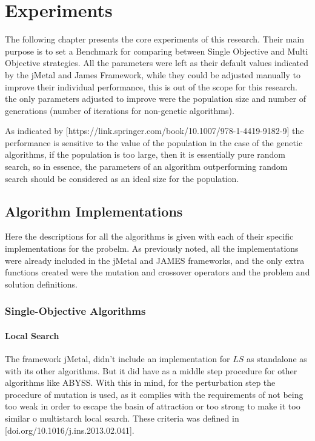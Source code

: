 \chapter{Experiments}
\label{chapter:chapter05}

The following chapter presents the core experiments of this research. Their main purpose is to set a Benchmark for comparing between Single Objective and Multi Objective strategies. All the parameters were left as their default values indicated by the jMetal and James Framework, while they could be adjusted manually to improve their individual performance, this is out of the scope for this research. the only parameters adjusted to improve were the population size and number of generations (number of iterations for non-genetic algorithms).

As indicated by [https://link.springer.com/book/10.1007/978-1-4419-9182-9] the performance is sensitive to the value of the population in the case of the genetic algorithms, if the population is too large, then it is essentially pure random search, so in essence, the parameters of an algorithm outperforming random search should be considered as an ideal size for the population.

\section{Algorithm Implementations}

Here the descriptions for all the algorithms is given with each of their specific implementations for the probelm. As previously noted, all the implementations were already included in the jMetal and JAMES frameworks, and the only extra functions created were the mutation and crossover operators and the problem and solution definitions.

\subsection{Single-Objective Algorithms}

\subsubsection{Local Search}

The framework jMetal, didn't include an implementation for $LS$ as standalone as with its other algorithms. But it did have as a middle step procedure for other algorithms like ABYSS. With this in mind, for the perturbation step the procedure of mutation is used, as it complies with the requirements of not being too weak in order to escape the basin of attraction or too strong to make it too similar o multistarch local search. These criteria was defined in [doi.org/10.1016/j.ins.2013.02.041].

